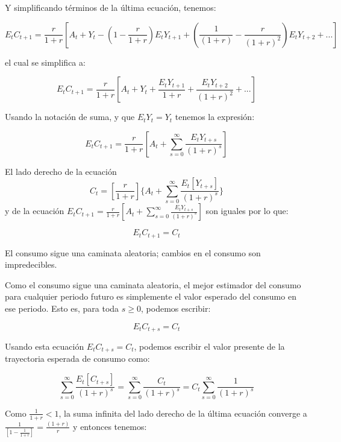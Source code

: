 \documentclass[
]{article}
\begin{document}
Y simplificando términos de la última ecuación, tenemos:

\begin{equation}
E_tC_{t+1}=\frac{r}{1+r}[A_t+Y_t-(1-\frac{r}{1+r})E_tY_{t+1}+(\frac{1}{(1+r)}-\frac{r}{(1+r)^2})E_tY_{t+2}+...]
\end{equation}

el cual se simplifica a:

\begin{equation}
E_tC_{t+1}=\frac{r}{1+r}[A_t+Y_t+\frac{E_tY_{t+1}}{1+r}+\frac{E_tY_{t+2}}{(1+r)^2}+...]
\end{equation}

Usando la notación de suma, y que \(E_tY_t=Y_t\) tenemos la expresión:

\begin{equation}
E_tC_{t+1}=\frac{r}{1+r}[A_t+\sum^\infty_{s=0}\frac{E_tY_{t+s}}{(1+r)^s}]
\end{equation}

El lado derecho de la ecuación
\[C_t=[\frac{r}{1+r}]\{A_t+\sum^\infty_{s=0}\frac{E_t[Y_{t+s}]}{(1+r)^s}\}\]
y de la ecuación
\(E_tC_{t+1}=\frac{r}{1+r}[A_t+\sum^\infty_{s=0}\frac{E_tY_{t+s}}{(1+r)^s}]\)
son iguales por lo que:

\begin{equation}
E_tC_{t+1}=C_t
\end{equation}

El consumo sigue una caminata aleatoria; cambios en el consumo son
impredecibles.

Como el consumo sigue una caminata aleatoria, el mejor estimador del
consumo para cualquier periodo futuro es simplemente el valor esperado
del consumo en ese periodo. Esto es, para toda \(s\geq 0\), podemos
escribir:

\begin{equation}
E_tC_{t+s}=C_t
\end{equation}

Usando esta ecuación \(E_tC_{t+s}=C_t\), podemos escribir el valor
presente de la trayectoria esperada de consumo como:

\begin{equation}
\sum^\infty_{s=0}\frac{E_t[C_{t+s}]}{(1+r)^s}=\sum^\infty_{s=0} \frac{C_t}{(1+r)^s}=C_t\sum^\infty_{s=0}\frac{1}{(1+r)^s}
\end{equation}

Como \(\frac{1}{1+r}<1\), la suma infinita del lado derecho de la última
ecuación converge a \(\frac{1}{[1-\frac{1}{1+r}]}=\frac{(1+r)}{r}\) y
entonces tenemos:
\end{document}
